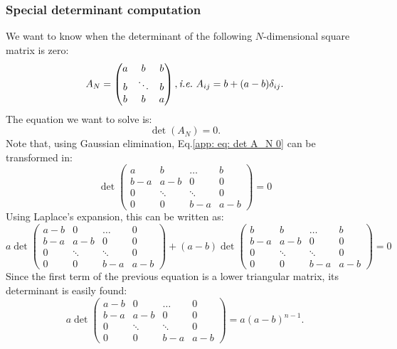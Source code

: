 \documentclass[12pt, titlepage, twoside, openright]{report}
\begin{document}
  \subsubsection{Special determinant computation}\label{app : special determinant computation}
  We want to know when the determinant of the following $N$-dimensional square matrix is zero:
  \begin{equation}
  A_N = \begin{pmatrix}
  a & b & b  \\
  b & \ddots & b  \\
  b & b & a
  \end{pmatrix}, \textit{i.e.} \ A_{ij} = b+(a-b)\delta_{ij}.
  \end{equation}
  The equation we want to solve is:
  \begin{equation}
  \det\left(A_N\right)=0. \label{app: eq: det A_N 0}
  \end{equation}
  Note that, using Gaussian elimination, Eq.\eqref{app: eq: det A_N 0} can be transformed in:
  \begin{equation}
  \det\begin{pmatrix}
  a & b & \dots & b \\
  b-a & a-b & 0 & 0 \\
  0 & \ddots & \ddots & 0 \\
  0 & 0 & b-a & a-b
  \end{pmatrix}=0
  \end{equation}
  Using Laplace's expansion, this can be written as:
  \begin{equation}
   a \det\begin{pmatrix}
  a-b & 0 & \dots & 0 \\
  b-a & a-b & 0 & 0 \\
  0 & \ddots & \ddots & 0 \\
  0 & 0 & b-a & a-b
  \end{pmatrix}+(a-b)
  \det\begin{pmatrix}
  b & b & \dots & b \\
  b-a & a-b & 0 & 0 \\
  0 & \ddots & \ddots & 0 \\
  0 & 0 & b-a & a-b
  \end{pmatrix}=0 \label{app: eq: laplace expansion}
  \end{equation}
  Since the first term of the previous equation is a lower triangular matrix, its determinant is easily found:
  \begin{equation}
  a \det\begin{pmatrix}
  a-b & 0 & \dots & 0 \\
  b-a & a-b & 0 & 0 \\
  0 & \ddots & \ddots & 0 \\
  0 & 0 & b-a & a-b
  \end{pmatrix} = a\left(a-b\right)^{n-1}.
  \end{equation}
\end{document}
